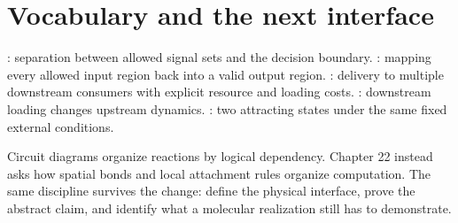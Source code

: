 \section{Vocabulary and the next interface}
: separation between allowed signal sets and the decision
boundary. : mapping every allowed input region back
into a valid output region. : delivery to multiple downstream
consumers with explicit resource and loading costs. :
downstream loading changes upstream dynamics. : two
attracting states under the same fixed external conditions.

Circuit diagrams organize reactions by logical dependency. Chapter 22 instead
asks how spatial bonds and local attachment rules organize computation.
The same discipline survives the change: define the physical interface,
prove the abstract claim, and identify what a molecular realization still
has to demonstrate.
